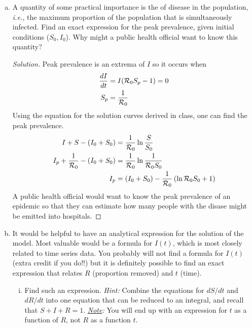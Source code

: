 \documentclass[12pt]{article}
\begin{document}
\begin{enumerate}[(a)]

\item A quantity of some practical importance is the  of disease in the population, \emph{i.e.,} the maximum proportion of the population that is simultaneously infected.  Find an exact expression for the peak prevalence, given initial conditions ($S_0,I_0$).  Why might a public health official want to know this quantity?

{\color{blue}
\begin{proof}[Solution]
{\color{magenta}

	Peak prevalence is an extrema of $I$ so it occurs when 
	\begin{align}
		\frac{dI}{dt} &= I({\cal R}_0 S_p - 1) = 0 \\
		S_p &= \frac{1}{{\cal R}_0}
	\end{align}
	Using the equation for the solution curves derived in class, one can find the peak prevalence.
	\begin{align}
		I + S - (I_0+S_0) &= \frac{1}{{\cal R}_0}\ln{\frac{S}{S_0}} \\
		I_p + \frac{1}{{\cal R}_0} - (I_0+S_0) &= \frac{1}{{\cal R}_0}\ln{\frac{1}{{\cal R}_0 S_0}} \\
		I_p &= (I_0+S_0) - \frac{1}{{\cal R}_0} \left (\ln{{\cal R}_0 S_0} +1 \right )
	\end{align}
	A public health official would want to know the peak prevalence of an epidemic so that they can estimate how many people with the disase might be emitted into hospitals.

}
\end{proof}
}

\item It would be helpful to have an analytical expression for the solution of the model.  Most valuable would be a formula for $I(t)$, which is most closely related to time series data.  You probably will not find a formula for $I(t)$ (extra credit if you do!!) but it is definitely possible to find an exact expression that relates $R$ (proportion removed) and $t$ (time).

\begin{enumerate}[(i)]

\item Find such an expression.  \emph{Hint:} Combine the equations for $dS/dt$ and $dR/dt$ into one equation that can be reduced to an integral, and recall that $S+I+R=1$.  \emph{\underline{Note}:} You will end up with an expression for $t$ as a function of $R$, not $R$ as a function $t$.


\end{enumerate}
\end{enumerate}
\end{document}
